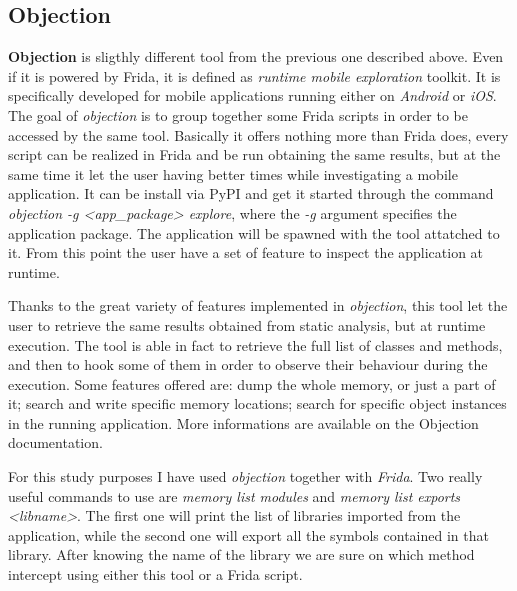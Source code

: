 		\subsection{Objection}
			\par \textbf{Objection} is sligthly different tool from the previous one described above. Even if it is powered by Frida, it is defined as \textit{runtime mobile exploration} toolkit. It is specifically developed for mobile applications running either on \textit{Android} or \textit{iOS}. The goal of \textit{objection} is to group together some Frida scripts in order to be accessed by the same tool. Basically it offers nothing more than Frida does, every script can be realized in Frida and be run obtaining the same results, but at the same time it let the user having better times while investigating a mobile application. \newline
			It can be install via PyPI and get it started through the command \textit{objection -g <app\_package> explore}, where the \textit{-g} argument specifies the application package. The application will be spawned with the tool attatched to it. From this point the user have a set of feature to inspect the application at runtime.	\newline
			\par Thanks to the great variety of features implemented in \textit{objection}, this tool let the user to retrieve the same results obtained from static analysis, but at runtime execution. The tool is able in fact to retrieve the full list of classes and methods, and then to hook some of them in order to observe their behaviour during the execution. Some features offered are: dump the whole memory, or just a part of it; search and write specific memory locations; search for specific object instances in the running application. More informations are available on the Objection documentation\cite{objection}.\newline
			\par For this study purposes I have used \textit{objection} together with \textit{Frida}. Two really useful commands to use are \textit{memory list modules} and \textit{memory list exports <libname>}. The first one will print the list of libraries imported from the application, while the second one will export all the symbols contained in that library. After knowing the name of the library we are sure on which method intercept using either this tool or a Frida script.
						

